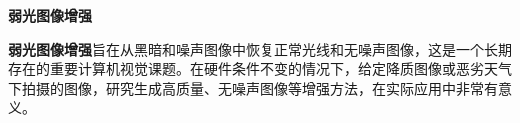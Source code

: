 \documentclass[CJK,aspectratio=169]{beamer}  %
\begin{document}
	\begin{frame}
	{ \yahei \textbf{弱光图像增强}}
	
	\vspace{0.1cm}

	{ \yahei \textbf{弱光图像增强}旨在从黑暗和噪声图像中恢复正常光线和无噪声图像，这是一个长期存在的重要计算机视觉课题。在硬件条件不变的情况下，给定降质图像或恶劣天气下拍摄的图像，研究生成高质量、无噪声图像等增强方法，在实际应用中非常有意义。}

		
	\begin{figure}
		\centering
		\setlength{\abovecaptionskip}{-0.15cm}
		\begin{minipage}{.08\paperwidth}
			\centering
			\setlength{\abovecaptionskip}{-0.45cm}

\end{minipage}
\end{figure}
\end{frame}
\end{document}
